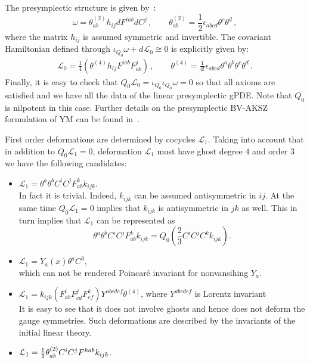 \documentclass[a4paper,12pt]{article}
\numberwithin{equation}{section} %
\renewcommand{\simeq}{\cong}
\newcommand{\half}{\mathchoice{%
    \ffrac{1}{2}}{\frac{1}{2}}{\frac{1}{2}}{\frac{1}{2}}}
\newcommand{\ffrac}[2]{\raisebox{.5pt}%
  {\footnotesize$\displaystyle\frac{#1}{#2}$}\kern1pt}
\def\cL{\mathcal{L}}
\begin{document}
The presymplectic structure is given by~\cite{Alkalaev:2013hta,Dneprov:2022jyn,Grigoriev:2022zlq}:
\begin{equation}
	\omega = \theta^{(2)}_{ab} h_{ij} d F^{iab} d C^j \,, \qquad \theta^{(2)}_{ab}=\frac{1}{2}\epsilon_{abcd}\theta^c\theta^d\,,
\end{equation}
where the matrix $h_{ij}$ is assumed symmetric and invertible. The covariant Hamiltonian defined through $\iota_{Q_{0}}\omega+d\cL_0\simeq 0$ is explicitly given by:
\begin{align}
	\cL_0=\frac{1}{4}\left( \theta^{(4)} h_{ij}F^{iab}F^j_{ab} \right)\,,  \qquad \theta^{(4)}=\frac{1}{4!}\epsilon_{abcd}\theta^a\theta^b\theta^c\theta^d\,.
\end{align}
Finally, it is easy to check that $Q_0\cL_0=\iota_{Q_0}\iota_{Q_0}\omega=0$ so that all axioms are satisfied and we have all the data of the linear presymplectic gPDE. Note that $Q_0$ is nilpotent in this case. Further details on the presymplectic BV-AKSZ formulation of YM can be found in~\cite{Grigoriev:2022zlq}.


First order deformations are determined by cocycles $\cL_1$. Taking into account that in addition to 
$Q_0\cL_1=0$, deformation $\cL_1$ must have ghost degree $4$ and order $3$ we have the following candidates:
\begin{itemize}
	\item $\cL_1=\theta^a\theta^b C^i C^j F^k_{ab} k_{ijk} $.\\
    In fact it is trivial. Indeed, $k_{ijk}$ can be assumed antisymmetric in $ij$. At the same time $Q_0\cL_1=0$ implies   that $k_{ijk}$ is antisymmetric in $jk$ as well. This in turn implies that $\cL_1$ can be represented as 
	\begin{equation}
		\theta^a\theta^b C^i C^j F^k_{ab} k_{ijk} = Q_0\left( \frac{2}{3}C^iC^jC^k k_{ijk} \right).
	\end{equation}
	
    
	\item $\cL_1= Y_a(x)\theta^a  C^3 $,\\
    which can not be rendered Poincar\'e invariant for nonvansihing $Y_a$.
    
    \item $\cL_1=k_{ijk}(F^i_{ab} F^j_{cd} F^k_{ef})Y^{abcdef} \theta^{(4)}$, where $Y^{abcdef}$ is Lorentz invariant\\
    It is easy to see that it does not involve ghosts and hence does not deform the gauge symmetries. Such deformations are described  by the invariants of the initial linear theory.

    \item $ \cL_1=\half\theta^{(2)}_{ab} C^i C^j F^{kab} k_{ijk} $.
\end{itemize}
\end{document}
